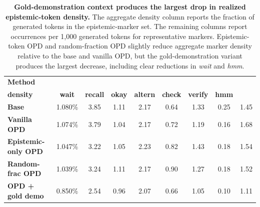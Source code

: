 \begin{table}[!htbp]
\centering
\caption{\textbf{Gold-demonstration context produces the largest drop in realized epistemic-token density.}
The aggregate density column reports the fraction of generated tokens in the epistemic-marker set. The remaining columns report occurrences per 1,000 generated tokens for representative markers. Epistemic-token OPD and random-fraction OPD slightly reduce aggregate marker density relative to the base and vanilla OPD, but the gold-demonstration variant produces the largest decrease, including clear reductions in \textit{wait} and \textit{hmm}.}
\label{tab:opd_ablation_epistemic_tokens}
\scriptsize
\setlength{\tabcolsep}{2pt}
\renewcommand{\arraystretch}{1.12}

\begin{tabular*}{\textwidth}{@{\extracolsep{\fill}}lcccccccc@{}}
\toprule
\textbf{Method}
& \shortstack{\textbf{Epistemic token}\\[-1pt]\textbf{density}}
& \textbf{wait}
& \textbf{recall}
& \textbf{okay}
& \textbf{altern}
& \textbf{check}
& \textbf{verify}
& \textbf{hmm} \\
\midrule
\textbf{Base}
& 1.080\%
& 3.85
& 1.11
& 2.17
& 0.64
& 1.33
& 0.25
& 1.45 \\
\textbf{Vanilla OPD}
& 1.074\%
& 3.79
& 1.04
& 2.17
& 0.72
& 1.19
& 0.16
& 1.68 \\
\textbf{Epistemic-only OPD}
& 1.047\%
& 3.22
& 1.05
& 2.23
& 0.82
& 1.43
& 0.18
& 1.54 \\
\textbf{Random-frac OPD}
& 1.039\%
& 3.24
& 1.11
& 2.17
& 0.90
& 1.27
& 0.18
& 1.52 \\
\textbf{OPD + gold demo}
& 0.850\%
& 2.54
& 0.96
& 2.07
& 0.66
& 1.05
& 0.10
& 1.11 \\
\bottomrule
\end{tabular*}
\end{table}
